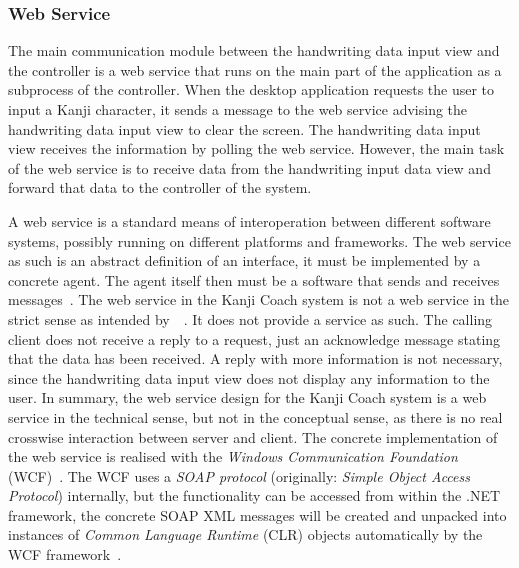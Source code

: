 \subsubsection{Web Service}
\label{sec:arch:webservice}

The main communication module between the handwriting data input view and the 
controller is a web service that runs on the main part of the application
as a subprocess of the controller. When the desktop application requests the 
user to input a Kanji character, it sends a message to the web service 
advising the handwriting data input view to clear the screen. 
The handwriting data input view receives the information by polling the 
web service. However, the main task of the web service is to receive data 
from the handwriting input data view and forward that data to the controller
of the system. 

A web service is a standard means of interoperation between different software
systems, possibly running on different platforms and frameworks. The web service
as such is an abstract definition of an interface, it must be implemented by a 
concrete agent. The agent itself then must be a software that sends and receives 
messages~.
The web service in the Kanji Coach system is not a web service in the strict 
sense as intended by~~\citeyear{W3C2004}. It does not 
provide a service as such. The calling client does not receive a reply to a 
request, just an acknowledge message stating that the data has been received. 
A reply with more information is not necessary, since the handwriting data 
input view does not display any information to the user. 
In summary, the web service design for the Kanji Coach system is a web service
in the technical sense, but not in the conceptual sense, as there is no real
crosswise interaction between server and client.
The concrete implementation of the web service is realised with the
\emph{Windows Communication Foundation} (WCF)~.
The WCF uses a \emph{SOAP protocol} (originally: 
\emph{Simple Object Access Protocol}) internally, but the functionality can be 
accessed from within the .NET framework, the concrete SOAP XML messages will 
be created and unpacked into instances of \emph{Common Language Runtime} (CLR) 
objects automatically by the WCF 
framework~.

